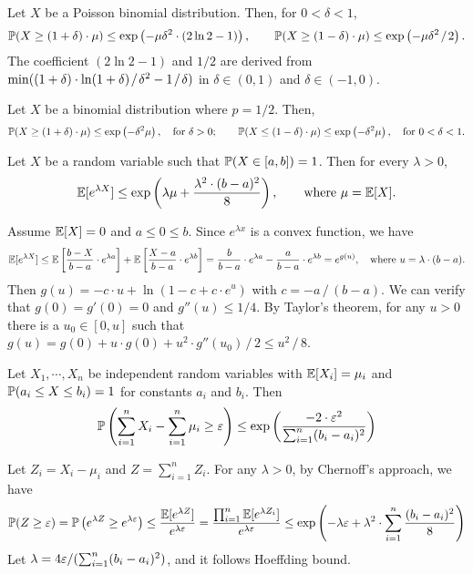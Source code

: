 \documentclass[main.tex]{subfiles}
\begin{document}
\begin{corollary}
	Let $X$ be a Poisson binomial distribution. Then, for $0<\delta<1$, 
	\[\mathbb{P}(X\ge(1+\delta)\cdot\mu)\le \exp\left(-\mu\delta^2\cdot (2\ln 2-1)\right),\qquad\mathbb{P}(X\ge(1-\delta)\cdot\mu)\le \exp\left(-\mu\delta^2\;\!/\;\! 2\right).\]
	The coefficient $(2\ln 2-1)$ and $1/2$ are derived from $\min((1+\delta)\cdot \ln(1+\delta)\;\!/\;\!\delta^2 - 1\;\!/\;\! \delta)$ in $\delta\in(0,1)$ and $\delta\in(-1,0)$.
\end{corollary}

\begin{theorem}
	Let $X$ be a binomial distribution where $p=1/2$. Then,
	\[
		\mathbb{P}(X\ge(1+\delta)\cdot\mu)\le \exp\left(-\delta^2\mu\right),\quad\text{for }\delta>0;\qquad
		\mathbb{P}(X\le(1-\delta)\cdot\mu)\le \exp\left(-\delta^2\mu\right),\quad\text{for }0<\delta<1.
	\]
\end{theorem}

\begin{lemma}
	Let $X$ be a random variable such that $\mathbb{P}(X\in[a,b])=1$. Then for every $\lambda>0$,
	\[\mathbb{E}[e^{\lambda X}]\le\exp\left(\lambda\mu+\frac{\lambda^2\cdot(b-a)^2}{8}\right),\qquad \text{where }\mu=\mathbb{E}[X].\]
\end{lemma}

\begin{pf}
	Assume $\mathbb{E}[X]=0$ and $a\le 0\le b$. Since $e^{\lambda x}$ is a convex function, we have
	\[\mathbb{E}[e^{\lambda X}]\le\mathbb{E}\left[\frac{b-X}{b-a}\cdot e^{\lambda a}\right] + \mathbb{E}\left[\frac{X-a}{b-a}\cdot e^{\lambda b}\right] = \frac{b}{b-a}\cdot e^{\lambda a} - \frac{a}{b-a}\cdot e^{\lambda b} = e^{g(u)},\quad\text{where }u=\lambda\cdot(b-a).\]
	Then $g(u)=-c\cdot u+\ln(1-c+c\cdot e^u)$ with $c=-a\,/\,(b-a)$. We can verify that $g(0)=g'(0)=0$ and $g''(u)\le 1/4$. By Taylor's theorem, for any $u > 0$ there is a $u_0\in[0,u]$ such that $g(u)=g(0)+u\cdot g(0)+u^2\cdot g''(u_0)\,/\,2\le u^2\,/\,8$.
\end{pf}

\begin{theorem}
	Let $X_1,\cdots,X_n$ be independent random variables with $\mathbb{E}[X_i]=\mu_i$ and $\mathbb{P}(a_i\le X\le b_i)=1$ for constants $a_i$ and $b_i$. Then
	\[
		\mathbb{P}\left(\sum_{i=1}^{n}X_i-\sum_{i=1}^{n}\mu_i\ge\varepsilon\right)\le \exp\left(\frac{-2\cdot\varepsilon^2}{\sum_{i=1}^{n}(b_i-a_i)^2}\right)
	\]
\end{theorem}

\begin{pf}
	Let $Z_i=X_i-\mu_i$ and $Z=\sum_{i=1}^{n}Z_i$. For any $\lambda>0$, by Chernoff's approach, we have
	\[
		\mathbb{P}(Z\ge\varepsilon)=\mathbb{P}\left(e^{\lambda Z}\ge e^{\lambda\varepsilon}\right) \le \frac{\mathbb{E}[e^{\lambda Z}]}{e^{\lambda \varepsilon}}=\frac{\prod_{i=1}^{n}\mathbb{E}[e^{\lambda Z_i}]}{e^{\lambda \varepsilon}}\le\exp\left(-\lambda\varepsilon+\lambda^2\cdot\sum_{i=1}^{n}\frac{(b_i-a_i)^2}{8}\right)
	\]
	Let $\lambda = 4\varepsilon / (\sum_{i=1}^{n}(b_i-a_i)^2)$, and it follows Hoeffding bound.
\end{pf}
\end{document}
